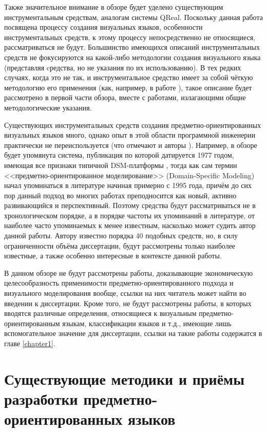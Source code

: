 Также значительное внимание в обзоре будет уделено существующим инструментальным средствам, 
аналогам системы QReal. Поскольку данная работа посвящена процессу создания визуальных 
языков, особенности инструментальных средств, к этому процессу непосредственно не 
относящиеся, рассматриваться не будут. Большинство имеющихся описаний инструментальных средств 
не фокусируются на какой-либо методологии создания визуального языка (представляя 
cредства, но не указания по их использованию). В тех редких случаях, когда это не так, 
и инструментальное средство имеет за собой чёткую методологию его применения (как, 
например, в работе \cite{repenning1995agentsheets}), такое описание будет рассмотрено в 
первой части обзора, вместе с работами, излагающими общие методологические указания.

Существующих инструментальных средств создания предметно-ориентированных визуальных 
языков много, однако опыт в этой области программной инженерии практически не переиспользуется 
(что отмечают и авторы \cite{kelly2008domain}). Например, в обзоре будет упомянута 
система, публикация по которой датируется 1977 годом, имеющая все признаки типичной 
\ac{DSM}-платформы \cite{teichroew1977psl}, тогда как сам термин <<предметно-ориентированное 
моделирование>> (Domain-Specific Modeling) начал упоминаться в литературе начиная примерно с 
1995 года, 
причём до сих пор данный подход во многих работах преподносится как новый, активно 
развивающийся и перспективный. Поэтому средства будут рассматриваться не в хронологическом 
порядке, а в порядке частоты их упоминаний в литературе, от наиболее часто упоминаемых к менее 
известным, насколько может судить автор данной работы. Автору известно порядка 40 подобных
средств, но, в силу ограниченности объёма диссертации, будут рассмотрены только наиболее 
известные, а также особенно интересные в контексте данной работы.

В данном обзоре не будут рассмотрены работы, доказывающие экономическую целесообразность
применимости предметно-ориентированного подхода и визуального моделирования вообще,
ссылки на них читатель может найти во введении к диссертации. Кроме того, не будут
рассмотрены работы, в которых вводятся различные определения, относящиеся к визуальным
предметно-ориентированным языкам, классификации языков и т.д., имеющие лишь вспомогательное
значение для диссертации, ссылки на такие работы содержатся в главе \ref{chapter1}.

\section{Существующие методики и приёмы разработки предметно-ориентированных языков}
